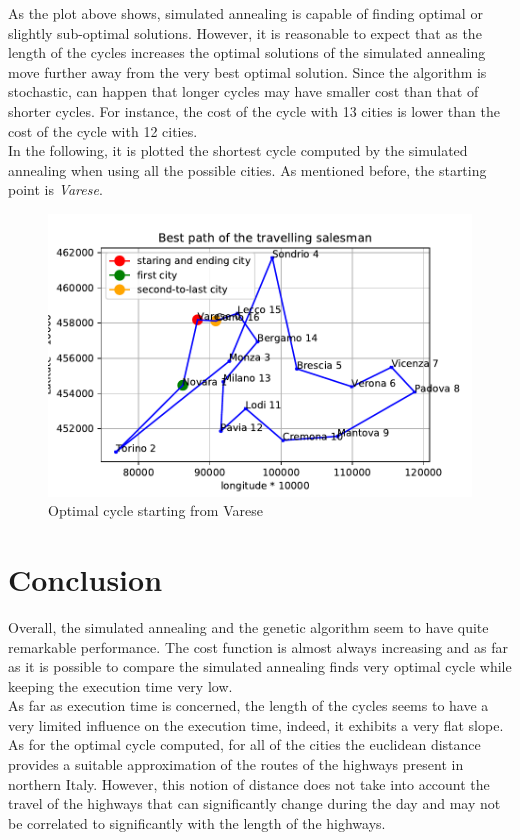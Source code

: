\documentclass{article}
\begin{document}
\noindent As the plot above shows, simulated annealing is capable of finding optimal or slightly sub-optimal solutions. However, it is reasonable to expect that as the length of the cycles increases the optimal solutions of the simulated annealing move further away from the very best optimal solution. Since the algorithm is stochastic, can happen that longer cycles may have smaller cost than that of shorter cycles. For instance, the cost of the cycle with 13 cities is lower than the cost of the cycle with 12 cities.\\
In the following, it is plotted the shortest cycle computed by the simulated annealing when using all the possible cities. As mentioned before, the starting point is \textit{Varese}.
\begin{figure}[H]
\includegraphics[scale=0.8]{../path.pdf} 
\centering
\caption{Optimal cycle starting from Varese}
\end{figure}

\section{Conclusion}
Overall, the simulated annealing and the genetic algorithm seem to have quite remarkable performance. The cost function is almost always increasing and as far as it is possible to compare the simulated annealing finds very optimal cycle while keeping the execution time very low. \\
As far as execution time is concerned, the length of the cycles seems to have a very limited influence on the execution time, indeed, it exhibits a very flat slope. \\
As for the optimal cycle computed, for all of the cities the euclidean distance provides a suitable approximation of the routes of the highways present in northern Italy. However, this notion of distance does not take into account the travel of the highways that can significantly change during the day and may not be correlated to significantly with the length of the highways. 
\end{document}
